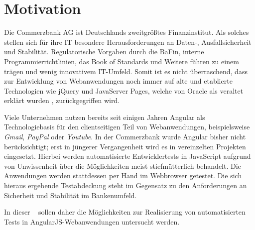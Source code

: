 \section{Motivation}\label{einleitung}
Die Commerzbank AG ist Deutschlands zweitgrößtes Finanzinstitut\cite[][2]{handelsblatt:commerzbank}. Als solches stellen sich für ihre IT besondere Herausforderungen an Daten-, Ausfallsicherheit und Stabilität. Regulatorische Vorgaben durch die BaFin\cite{bafin-banken}, interne Programmierrichtlinien\cite{coba-programmierrichtlinienAllgemein, coba-programmierrichtlinienJavaScript}, das Book of Standards \cite{coba-bookOfStandards} und Weitere führen zu einem trägen und wenig innovativem IT-Umfeld. Somit ist es nicht überraschend, dass zur Entwicklung von Webanwendungen noch immer auf alte und etablierte Technologien wie jQuery und JavaServer Pages, welche von Oracle als veraltet erklärt wurden \cite{jsp-deprecated}, zurückgegriffen wird.

Viele Unternehmen nutzen bereits seit einigen Jahren Angular als Technologiebasis für den clientseitigen Teil von Webanwendungen, beispielsweise \textit{Gmail}, \textit{PayPal} oder \textit{Youtube}\cite{angular-sites}. In der Commerzbank wurde Angular bisher nicht berücksichtigt; erst in jüngerer Vergangenheit wird es in vereinzelten Projekten eingesetzt. Hierbei werden automatisierte Entwicklertests in JavaScript aufgrund von Unwissenheit über die Möglichkeiten meist stiefmütterlich behandelt. Die Anwendungen werden stattdessen per Hand im Webbrowser getestet. Die sich hieraus ergebende Testabdeckung steht im Gegensatz zu den Anforderungen an Sicherheit und Stabilität im Bankenumfeld.

In dieser \titleDocument~ sollen daher die Möglichkeiten zur Realisierung von automatisierten Tests in AngularJS-Webanwendungen untersucht werden.